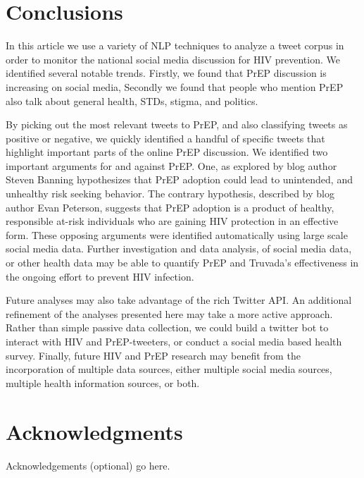 \documentclass{sig-alternate-05-2015}
\begin{document}
\section{Conclusions}

In this article we use a variety of NLP techniques to analyze a tweet corpus in order to monitor the national social media discussion for HIV prevention. We identified several notable trends. Firstly, we found that PrEP discussion is increasing on social media, Secondly we found that people who mention PrEP also talk about general health, STDs, stigma, and politics.

By picking out the most relevant tweets to PrEP, and also classifying tweets as positive or negative, we quickly identified a handful of specific tweets that highlight important parts of the online PrEP discussion. We identified two important arguments for and against PrEP. One, as explored by blog author Steven Banning hypothesizes that PrEP adoption could lead to unintended, and unhealthy risk seeking behavior. The contrary hypothesis, described by blog author Evan Peterson, suggests that PrEP adoption is a product of healthy, responsible at-risk individuals who are gaining HIV protection in an effective form. These opposing arguments were identified automatically using large scale social media data. Further investigation and data analysis, of social media data, or other health data may be able to quantify PrEP and Truvada's effectiveness in the ongoing effort to prevent HIV infection.

Future analyses may also take advantage of the rich Twitter API. An additional refinement of the analyses presented here may take a more active approach. Rather than simple passive data collection, we could build a twitter bot to interact with HIV and PrEP-tweeters, or conduct a social media based health survey. Finally, future HIV and PrEP research may benefit from the incorporation of multiple data sources, either multiple social media sources, multiple health information sources, or both.


\section{Acknowledgments}

Acknowledgements (optional) go here.

%

%
%





\end{document}
